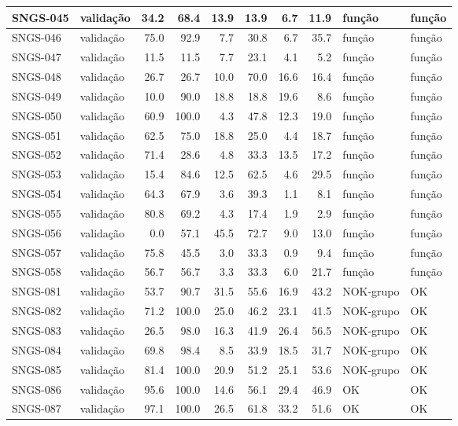 \begin{small}
\begin{longtable}{|l|l|r|r|r|r|r|r|l|l|}
SNGS-045 & validação & 34.2 & 68.4 & 13.9 & 13.9 & 6.7 & 11.9 & função & função \\ \hline
SNGS-046 & validação & 75.0 & 92.9 & 7.7 & 30.8 & 6.7 & 35.7 & função & função \\ \hline
SNGS-047 & validação & 11.5 & 11.5 & 7.7 & 23.1 & 4.1 & 5.2 & função & função \\ \hline
SNGS-048 & validação & 26.7 & 26.7 & 10.0 & 70.0 & 16.6 & 16.4 & função & função \\ \hline
SNGS-049 & validação & 10.0 & 90.0 & 18.8 & 18.8 & 19.6 & 8.6 & função & função \\ \hline
SNGS-050 & validação & 60.9 & 100.0 & 4.3 & 47.8 & 12.3 & 19.0 & função & função \\ \hline
SNGS-051 & validação & 62.5 & 75.0 & 18.8 & 25.0 & 4.4 & 18.7 & função & função \\ \hline
SNGS-052 & validação & 71.4 & 28.6 & 4.8 & 33.3 & 13.5 & 17.2 & função & função \\ \hline
SNGS-053 & validação & 15.4 & 84.6 & 12.5 & 62.5 & 4.6 & 29.5 & função & função \\ \hline
SNGS-054 & validação & 64.3 & 67.9 & 3.6 & 39.3 & 1.1 & 8.1 & função & função \\ \hline
SNGS-055 & validação & 80.8 & 69.2 & 4.3 & 17.4 & 1.9 & 2.9 & função & função \\ \hline
SNGS-056 & validação & 0.0 & 57.1 & 45.5 & 72.7 & 9.0 & 13.0 & função & função \\ \hline
SNGS-057 & validação & 75.8 & 45.5 & 3.0 & 33.3 & 0.9 & 9.4 & função & função \\ \hline
SNGS-058 & validação & 56.7 & 56.7 & 3.3 & 33.3 & 6.0 & 21.7 & função & função \\ \hline
SNGS-081 & validação & 53.7 & 90.7 & 31.5 & 55.6 & 16.9 & 43.2 & NOK-grupo & OK \\ \hline
SNGS-082 & validação & 71.2 & 100.0 & 25.0 & 46.2 & 23.1 & 41.5 & NOK-grupo & OK \\ \hline
SNGS-083 & validação & 26.5 & 98.0 & 16.3 & 41.9 & 26.4 & 56.5 & NOK-grupo & OK \\ \hline
SNGS-084 & validação & 69.8 & 98.4 & 8.5 & 33.9 & 18.5 & 31.7 & NOK-grupo & OK \\ \hline
SNGS-085 & validação & 81.4 & 100.0 & 20.9 & 51.2 & 25.1 & 53.6 & NOK-grupo & OK \\ \hline
SNGS-086 & validação & 95.6 & 100.0 & 14.6 & 56.1 & 29.4 & 46.9 & OK & OK \\ \hline
SNGS-087 & validação & 97.1 & 100.0 & 26.5 & 61.8 & 33.2 & 51.6 & OK & OK \\ \hline

\end{longtable}
\end{small}
